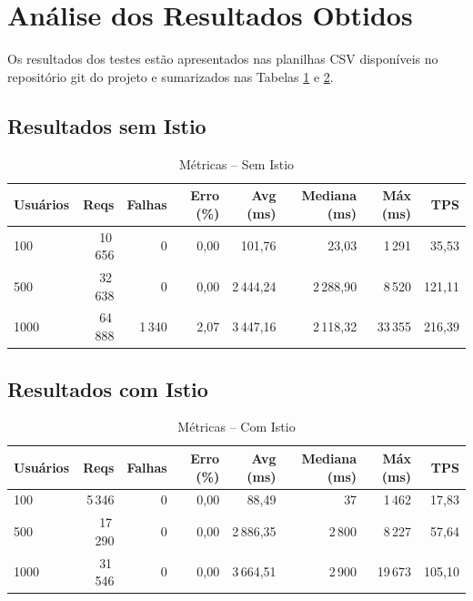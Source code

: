 \documentclass[12pt,a4paper]{report}
\begin{document}
\section{Análise dos Resultados Obtidos}
Os resultados dos testes estão apresentados nas planilhas CSV disponíveis no repositório git do projeto e sumarizados nas Tabelas \ref{tab:sem-istio} e \ref{tab:com-istio}.

\subsection{Resultados sem Istio}
\begin{table}[h]
\centering
\caption{Métricas – Sem Istio}\label{tab:sem-istio}
\begin{tabular}{@{}lrrrrrrr@{}}
\toprule
Usuários & Reqs & Falhas & Erro (\%) & Avg (ms) & Mediana (ms) & Máx (ms) & TPS \\
\midrule
100  & 10\,656 & 0     & 0,00 & 101,76 & 23,03  & 1\,291  & 35,53  \\
500  & 32\,638 & 0     & 0,00 & 2\,444,24 & 2\,288,90 & 8\,520  & 121,11 \\
1000 & 64\,888 & 1\,340 & 2,07 & 3\,447,16 & 2\,118,32 & 33\,355 & 216,39 \\
\bottomrule
\end{tabular}
\end{table}

\subsection{Resultados com Istio}
\begin{table}[h]
\centering
\caption{Métricas – Com Istio}\label{tab:com-istio}
\begin{tabular}{@{}lrrrrrrr@{}}
\toprule
Usuários & Reqs & Falhas & Erro (\%) & Avg (ms) & Mediana (ms) & Máx (ms) & TPS \\
\midrule
100  & 5\,346  & 0     & 0,00 & 88,49   & 37      & 1\,462  & 17,83  \\
500  & 17\,290 & 0     & 0,00 & 2\,886,35 & 2\,800  & 8\,227  & 57,64  \\
1000 & 31\,546 & 0     & 0,00 & 3\,664,51 & 2\,900  & 19\,673 & 105,10 \\
\bottomrule
\end{tabular}
\end{table}
\end{document}
